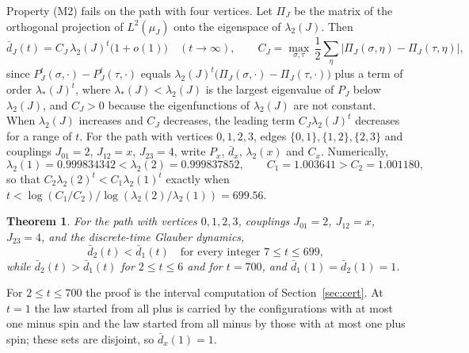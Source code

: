 \documentclass[11pt]{amsart}
\newtheorem{theorem}{Theorem}
\theoremstyle{remark}
\newcommand{\dbar}{\bar d}
\begin{document}
Property (M2) fails on the path with four vertices. Let $\Pi_J$ be the matrix of the orthogonal projection of $L^2(\mu_J)$ onto the eigenspace of $\lambda_2(J)$. Then
\begin{equation}\label{eq:asym}
\dbar_J(t)=C_J\,\lambda_2(J)^t\bigl(1+o(1)\bigr)\quad(t\to\infty),\qquad
C_J=\max_{\sigma,\tau}\,\frac12\sum_{\eta}\bigl|\Pi_J(\sigma,\eta)-\Pi_J(\tau,\eta)\bigr|,
\end{equation}
since $P_J^t(\sigma,\cdot)-P_J^t(\tau,\cdot)$ equals $\lambda_2(J)^t\bigl(\Pi_J(\sigma,\cdot)-\Pi_J(\tau,\cdot)\bigr)$ plus a term of order $\lambda_*(J)^t$, where $\lambda_*(J)<\lambda_2(J)$ is the largest eigenvalue of $P_J$ below $\lambda_2(J)$, and $C_J>0$ because the eigenfunctions of $\lambda_2(J)$ are not constant. When $\lambda_2(J)$ increases and $C_J$ decreases, the leading term $C_J\lambda_2(J)^t$ decreases for a range of $t$. For the path with vertices $0,1,2,3$, edges $\{0,1\},\{1,2\},\{2,3\}$ and couplings $J_{01}=2$, $J_{12}=x$, $J_{23}=4$, write $P_x$, $\dbar_x$, $\lambda_2(x)$ and $C_x$. Numerically,
\[
\lambda_2(1)=0.999834342<\lambda_2(2)=0.999837852,\qquad C_1=1.003641>C_2=1.001180,
\]
so that $C_2\lambda_2(2)^t<C_1\lambda_2(1)^t$ exactly when $t<\log(C_1/C_2)/\log(\lambda_2(2)/\lambda_2(1))=699.56$.

\begin{theorem}\label{thm:main}
For the path with vertices $0,1,2,3$, couplings $J_{01}=2$, $J_{12}=x$, $J_{23}=4$, and the discrete-time Glauber dynamics,
\[
\dbar_2(t)<\dbar_1(t)\quad\text{for every integer } 7\le t\le 699,
\]
while $\dbar_2(t)>\dbar_1(t)$ for $2\le t\le6$ and for $t=700$, and $\dbar_1(1)=\dbar_2(1)=1$.
\end{theorem}

For $2\le t\le700$ the proof is the interval computation of Section~\ref{sec:cert}. At $t=1$ the law started from all plus is carried by the configurations with at most one minus spin and the law started from all minus by those with at most one plus spin; these sets are disjoint, so $\dbar_x(1)=1$.
\end{document}
